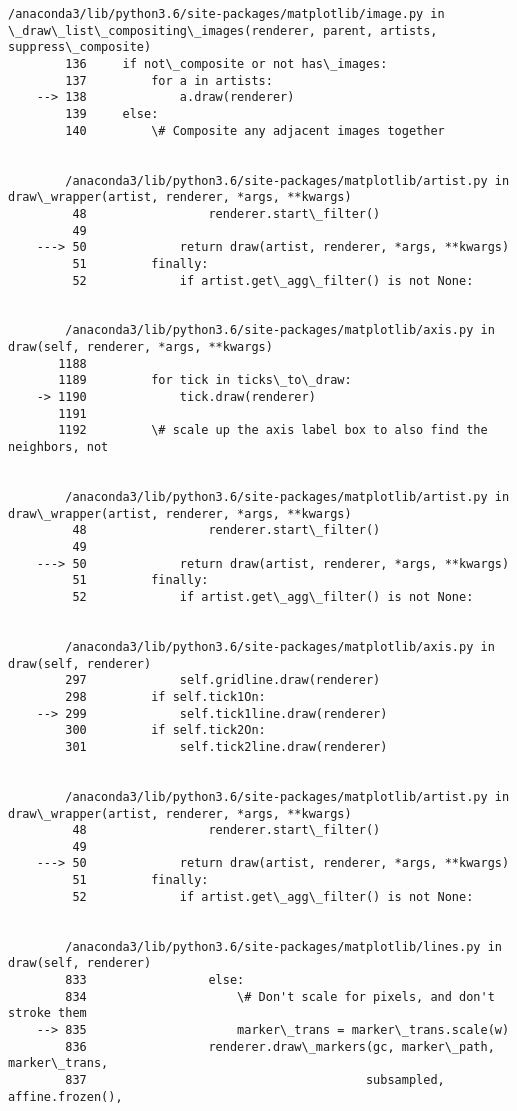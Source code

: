 \documentclass[11pt]{article}
\begin{document}
\begin{Verbatim}[commandchars=\\\{\}]
        /anaconda3/lib/python3.6/site-packages/matplotlib/image.py in \_draw\_list\_compositing\_images(renderer, parent, artists, suppress\_composite)
        136     if not\_composite or not has\_images:
        137         for a in artists:
    --> 138             a.draw(renderer)
        139     else:
        140         \# Composite any adjacent images together


        /anaconda3/lib/python3.6/site-packages/matplotlib/artist.py in draw\_wrapper(artist, renderer, *args, **kwargs)
         48                 renderer.start\_filter()
         49 
    ---> 50             return draw(artist, renderer, *args, **kwargs)
         51         finally:
         52             if artist.get\_agg\_filter() is not None:


        /anaconda3/lib/python3.6/site-packages/matplotlib/axis.py in draw(self, renderer, *args, **kwargs)
       1188 
       1189         for tick in ticks\_to\_draw:
    -> 1190             tick.draw(renderer)
       1191 
       1192         \# scale up the axis label box to also find the neighbors, not


        /anaconda3/lib/python3.6/site-packages/matplotlib/artist.py in draw\_wrapper(artist, renderer, *args, **kwargs)
         48                 renderer.start\_filter()
         49 
    ---> 50             return draw(artist, renderer, *args, **kwargs)
         51         finally:
         52             if artist.get\_agg\_filter() is not None:


        /anaconda3/lib/python3.6/site-packages/matplotlib/axis.py in draw(self, renderer)
        297             self.gridline.draw(renderer)
        298         if self.tick1On:
    --> 299             self.tick1line.draw(renderer)
        300         if self.tick2On:
        301             self.tick2line.draw(renderer)


        /anaconda3/lib/python3.6/site-packages/matplotlib/artist.py in draw\_wrapper(artist, renderer, *args, **kwargs)
         48                 renderer.start\_filter()
         49 
    ---> 50             return draw(artist, renderer, *args, **kwargs)
         51         finally:
         52             if artist.get\_agg\_filter() is not None:


        /anaconda3/lib/python3.6/site-packages/matplotlib/lines.py in draw(self, renderer)
        833                 else:
        834                     \# Don't scale for pixels, and don't stroke them
    --> 835                     marker\_trans = marker\_trans.scale(w)
        836                 renderer.draw\_markers(gc, marker\_path, marker\_trans,
        837                                       subsampled, affine.frozen(),



\end{Verbatim}
\end{document}
